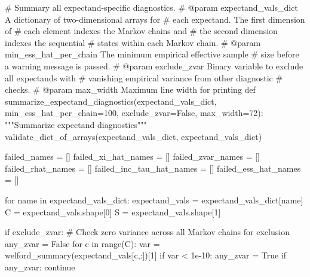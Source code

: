\documentclass[
  letterpaper,
  DIV=11,
  numbers=noendperiod]{scrartcl}
\newenvironment{Shaded}{\begin{snugshade}}{\end{snugshade}}
\newcommand{\BuiltInTok}[1]{\textcolor[rgb]{0.00,0.23,0.31}{#1}}
\newcommand{\CommentTok}[1]{\textcolor[rgb]{0.37,0.37,0.37}{#1}}
\newcommand{\ControlFlowTok}[1]{\textcolor[rgb]{0.00,0.23,0.31}{#1}}
\newcommand{\DecValTok}[1]{\textcolor[rgb]{0.68,0.00,0.00}{#1}}
\newcommand{\FloatTok}[1]{\textcolor[rgb]{0.68,0.00,0.00}{#1}}
\newcommand{\KeywordTok}[1]{\textcolor[rgb]{0.00,0.23,0.31}{#1}}
\newcommand{\NormalTok}[1]{\textcolor[rgb]{0.00,0.23,0.31}{#1}}
\newcommand{\OperatorTok}[1]{\textcolor[rgb]{0.37,0.37,0.37}{#1}}
\newcommand{\StringTok}[1]{\textcolor[rgb]{0.13,0.47,0.30}{#1}}
\newcommand{\VariableTok}[1]{\textcolor[rgb]{0.07,0.07,0.07}{#1}}
\begin{document}
\begin{Shaded}
\begin{Highlighting}[]
\CommentTok{\# Summary all expectand{-}specific diagnostics.}
\CommentTok{\# @param expectand\_vals\_dict A dictionary of two{-}dimensional arrays for}
\CommentTok{\#                            each expectand.  The first dimension of}
\CommentTok{\#                            each element indexes the Markov chains and}
\CommentTok{\#                            the second dimension indexes the sequential}
\CommentTok{\#                            states within each Markov chain.}
\CommentTok{\# @param min\_ess\_hat\_per\_chain The minimum empirical effective sample}
\CommentTok{\#                              size before a warning message is passed.}
\CommentTok{\# @param exclude\_zvar Binary variable to exclude all expectands with}
\CommentTok{\#                     vanishing empirical variance from other diagnostic}
\CommentTok{\#                     checks.}
\CommentTok{\# @param max\_width Maximum line width for printing}
\KeywordTok{def}\NormalTok{ summarize\_expectand\_diagnostics(expectand\_vals\_dict,}
\NormalTok{                                    min\_ess\_hat\_per\_chain}\OperatorTok{=}\DecValTok{100}\NormalTok{,}
\NormalTok{                                    exclude\_zvar}\OperatorTok{=}\VariableTok{False}\NormalTok{,}
\NormalTok{                                    max\_width}\OperatorTok{=}\DecValTok{72}\NormalTok{):}
  \CommentTok{"""Summarize expectand diagnostics"""}
\NormalTok{  validate\_dict\_of\_arrays(expectand\_vals\_dict, }\StringTok{\textquotesingle{}expectand\_vals\_dict\textquotesingle{}}\NormalTok{)}

\NormalTok{  failed\_names }\OperatorTok{=}\NormalTok{ []}
\NormalTok{  failed\_xi\_hat\_names }\OperatorTok{=}\NormalTok{ []}
\NormalTok{  failed\_zvar\_names }\OperatorTok{=}\NormalTok{ []}
\NormalTok{  failed\_rhat\_names }\OperatorTok{=}\NormalTok{ []}
\NormalTok{  failed\_inc\_tau\_hat\_names }\OperatorTok{=}\NormalTok{ []}
\NormalTok{  failed\_ess\_hat\_names }\OperatorTok{=}\NormalTok{ []}

  \ControlFlowTok{for}\NormalTok{ name }\KeywordTok{in}\NormalTok{ expectand\_vals\_dict:}
\NormalTok{    expectand\_vals }\OperatorTok{=}\NormalTok{ expectand\_vals\_dict[name]}
\NormalTok{    C }\OperatorTok{=}\NormalTok{ expectand\_vals.shape[}\DecValTok{0}\NormalTok{]}
\NormalTok{    S }\OperatorTok{=}\NormalTok{ expectand\_vals.shape[}\DecValTok{1}\NormalTok{]}

    \ControlFlowTok{if}\NormalTok{ exclude\_zvar:}
      \CommentTok{\# Check zero variance across all Markov chains for exclusion}
\NormalTok{      any\_zvar }\OperatorTok{=} \VariableTok{False}
      \ControlFlowTok{for}\NormalTok{ c }\KeywordTok{in} \BuiltInTok{range}\NormalTok{(C):}
\NormalTok{        var }\OperatorTok{=}\NormalTok{ welford\_summary(expectand\_vals[c,:])[}\DecValTok{1}\NormalTok{]}
        \ControlFlowTok{if}\NormalTok{ var }\OperatorTok{\textless{}} \FloatTok{1e{-}10}\NormalTok{:}
\NormalTok{          any\_zvar }\OperatorTok{=} \VariableTok{True}
      \ControlFlowTok{if}\NormalTok{ any\_zvar:}
        \ControlFlowTok{continue}


\end{Highlighting}
\end{Shaded}
\end{document}
